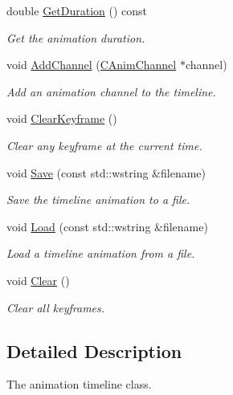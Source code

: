 \begin{DoxyCompactItemize}
double \hyperlink{class_c_timeline_a5638f7be740db313fb156f1fa3d8e03d}{Get\+Duration} () const 
\begin{DoxyCompactList}\small\item\em Get the animation duration. \end{DoxyCompactList}\item 
void \hyperlink{class_c_timeline_ac97b97b9c86dae3f8668cc42b8d1f455}{Add\+Channel} (\hyperlink{class_c_anim_channel}{C\+Anim\+Channel} $\ast$channel)
\begin{DoxyCompactList}\small\item\em Add an animation channel to the timeline. \end{DoxyCompactList}\item 
\hypertarget{class_c_timeline_a2bfaaa0a7d5fcd9ef041dbc2c2d5f9ba}{void \hyperlink{class_c_timeline_a2bfaaa0a7d5fcd9ef041dbc2c2d5f9ba}{Clear\+Keyframe} ()}\label{class_c_timeline_a2bfaaa0a7d5fcd9ef041dbc2c2d5f9ba}

\begin{DoxyCompactList}\small\item\em Clear any keyframe at the current time. \end{DoxyCompactList}\item 
void \hyperlink{class_c_timeline_a9e5db8d5f292f87a3864c66a71c6a70a}{Save} (const std\+::wstring \&filename)
\begin{DoxyCompactList}\small\item\em Save the timeline animation to a file. \end{DoxyCompactList}\item 
void \hyperlink{class_c_timeline_a39f85a61a4df2ea0ae8129bf2b28d0e7}{Load} (const std\+::wstring \&filename)
\begin{DoxyCompactList}\small\item\em Load a timeline animation from a file. \end{DoxyCompactList}\item 
\hypertarget{class_c_timeline_a14be47e5526d88654d6ee07951c82cc7}{void \hyperlink{class_c_timeline_a14be47e5526d88654d6ee07951c82cc7}{Clear} ()}\label{class_c_timeline_a14be47e5526d88654d6ee07951c82cc7}

\begin{DoxyCompactList}\small\item\em Clear all keyframes. \end{DoxyCompactList}\end{DoxyCompactItemize}


\subsection{Detailed Description}
The animation timeline class. 

